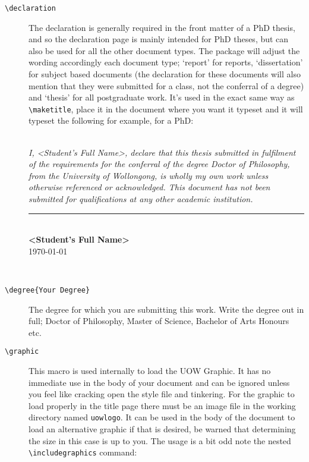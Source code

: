 \documentclass[12pt,oneside]{article}
\newcommand{\command}[1]{\texttt{\color{Red}#1}} %
\newcommand{\comoptions}[1]{\texttt{\color{Blue}#1}} %
\begin{document}
\begin{description}
    \item[\command{\textbackslash{}declaration}] The declaration is generally required in the front matter of a PhD thesis, and so the declaration page is mainly intended for PhD theses, but can also be used for all the other document types. The package will adjust the wording accordingly each document type; `report' for reports, `dissertation' for subject based documents (the declaration for these documents will also mention that they were submitted for a class, not the conferral of a degree) and `thesis' for all postgraduate work. It's used in the exact same way as \command{\textbackslash{}maketitle}, place it in the document where you want it typeset and it will typeset the following for example, for a PhD:\\
    
\\

{\itshape\noindent I, \textless{}Student's Full Name\textgreater, declare that this thesis submitted in fulfilment of the requirements for the conferral of the degree Doctor of Philosophy, from the University of Wollongong, is wholly my own work unless otherwise referenced or acknowledged. This document has not been submitted for qualifications at any other academic institution.\par
\vspace{1cm}
\noindent\rule{0.4\textwidth}{0.5pt}
\vspace{1ex}\\
\textbf{\textless{}Student's Full Name\textgreater}\\
\today}\\

    \item[\command{\textbackslash{}degree}\comoptions{\{Your Degree\}}] The degree for which you are submitting this work. Write the degree out in full; Doctor of Philosophy, Master of Science, Bachelor of Arts Honours etc.
    
    \item[\command{\textbackslash{}graphic}] This macro is used internally to load the UOW Graphic. It has no immediate use in the body of your document and can be ignored unless you feel like cracking open the style file and tinkering. For the graphic to load properly in the title page there must be an image file in the working directory named \texttt{uow\textunderscore{}logo}. It can be used in the body of the document to load an alternative graphic if that is desired, be warned that determining the size in this case is up to you.
    The usage is a bit odd note the nested \command{\textbackslash{}includegraphics} command:
    

\end{description}
\end{document}
